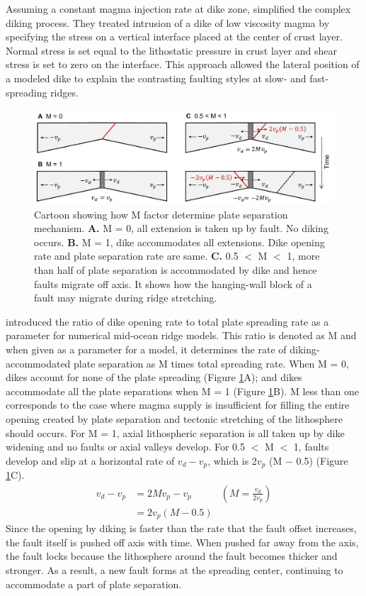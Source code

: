 \documentclass[letterpaper,12pt,notitle]{memphisthesis}                     %
\begin{document}
Assuming a constant magma injection rate at dike zone, \citet{Buck1998} simplified the complex diking process. They treated intrusion of a dike of low viscosity magma by specifying the stress on a vertical interface placed at the center of crust layer. Normal stress is set equal to the lithostatic pressure in crust layer and shear stress is set to zero on the interface.
This approach allowed the lateral position of a modeled dike to explain the contrasting faulting styles at slow- and fast-spreading ridges.

\begin{figure}[!htb]
    \centering
    \includegraphics[width=0.99\linewidth]{./figs/mfactor.pdf}
    \caption{Cartoon showing how M factor determine plate separation mechanism. \textbf{A.} M = 0, all extension is taken up by fault. No diking occurs. \textbf{B.} M = 1, dike accommodates all extensions. Dike opening rate and plate separation rate are same. \textbf{C.} 0.5 $<$ M $<$ 1, more than half of plate separation is accommodated by dike and hence faults migrate off axis. It shows how the hanging-wall block of a fault may migrate during ridge stretching.}
    \label{fig:mcartoon}
\end{figure}

\citet{Buck2005} introduced the ratio of dike opening rate to total plate spreading rate as a parameter for numerical mid-ocean ridge models. This ratio is denoted as M and when given as a parameter for a model, it determines the rate of diking-accommodated plate separation as M times total spreading rate. When M = 0, dikes account for none of the plate spreading (Figure \ref{fig:mcartoon}A); and dikes accommodate all the plate separations when M = 1 (Figure \ref{fig:mcartoon}B). M less than one corresponds to the case where magma supply is insufficient for filling the entire opening created by plate separation and tectonic stretching of the lithosphere should occurs. For M = 1, axial lithospheric separation is all taken up by dike widening and no faults or axial valleys develop.  For 0.5 $<$ M $<$ 1, faults develop and slip at a horizontal rate of  $v_d-v_p$, which is 2$v_p$ (M $-$ 0.5) (Figure \ref{fig:mcartoon}C). 
\begin{align}
v_d - v_p &= 2 M v_p - v_p 
&( M = \frac{v_d}{2 v_p}) \\
                &= 2v_p (M - 0.5)
\end{align}
Since the opening by diking is faster than the rate that the fault offset increases, the fault itself is pushed off axis with time. When pushed far away from the axis, the fault locks because the lithosphere around the fault becomes thicker and stronger. As a result, a new fault forms at the spreading center, continuing to accommodate a part of plate separation. 
\end{document}
